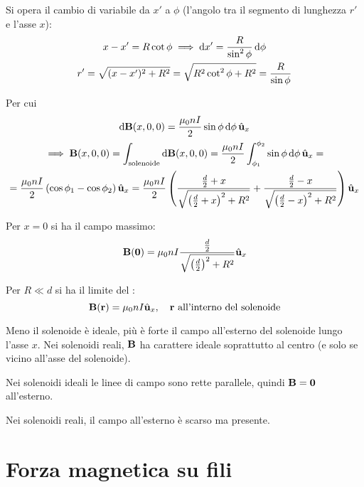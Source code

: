 
Si opera il cambio di variabile da $x'$ a $\phi$ (l'angolo tra il segmento di lunghezza $r'$ e l'asse $x$):
\begin{gather}
    x - x' = R \cot\phi \implies \mathrm{d} x' = \frac{R}{\sin^2\phi} \, \mathrm{d} \phi \\
    r' = \sqrt{(x - x')^2 + R^2} = \sqrt{R^2 \cot^2\phi + R^2} = \frac{R}{\sin\phi}
\end{gather}

Per cui
\begin{gather}
    \mathrm{d}\mathbf{B}(x, 0, 0) = \frac{\mu_0 n I}{2} \sin\phi \, \mathrm{d} \phi \, \hat{\mathbf{u}}_{x} \\
\begin{gathered}
    \implies \mathbf{B}(x, 0, 0) = \int_\mathrm{solenoide} \mathrm{d}\mathbf{B}(x, 0, 0)
    = \frac{\mu_0 n I}{2} \int_{\phi_1}^{\phi_2} \sin\phi \, \mathrm{d} \phi \, \hat{\mathbf{u}}_{x} = \\
    = \frac{\mu_0 n I}{2} \left( \cos\phi_1 - \cos\phi_2 \right) \hat{\mathbf{u}}_{x}
    = \frac{\mu_0 n I}{2} \left( 
        \frac{\frac{d}{2} + x}{\sqrt{\left( \frac{d}{2}+x \right)^2 + R^2}}
        + \frac{\frac{d}{2} - x}{\sqrt{\left( \frac{d}{2}-x \right)^2 + R^2}}
     \right) \hat{\mathbf{u}}_{x}
\end{gathered}
\end{gather}

Per $x = 0$ si ha il campo massimo:
\begin{equation}
    \mathbf{B}(\mathbf{0}) = \mu_0 n I \frac{\frac{d}{2}}{\sqrt{\left( \frac{d}{2} \right)^2 + R^2}} \hat{\mathbf{u}}_{x}
\end{equation}

Per $R \ll d$ si ha il limite del :
\begin{equation}
    \mathbf{B}(\mathbf{r}) = \mu_0 n I \hat{\mathbf{u}}_{x}, \quad \text{$\mathbf{r}$ all'interno del solenoide}
\end{equation}

Meno il solenoide è ideale, più è forte il campo all'esterno del solenoide lungo l'asse $x$.
Nei solenoidi reali, $\mathbf{B}$ ha carattere ideale soprattutto al centro (e solo se vicino all'asse del solenoide).

Nei solenoidi ideali le linee di campo sono rette parallele, quindi $\mathbf{B} = \mathbf{0}$ all'esterno.

Nei solenoidi reali, il campo all'esterno è scarso ma presente.



\section{Forza magnetica su fili}

